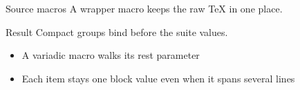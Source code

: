 


\begin{frame}{Source macros}
{%
\small\color{red}
A wrapper macro keeps the raw TeX in one place.
}

{%
\small\color{red}
}

\begin{block}{%
Result
}
Compact groups bind before the suite values.
\end{block}

\begin{itemize}
\item
A variadic macro walks its rest parameter
\item
Each item stays one block value
even when it spans several lines
\end{itemize}
\end{frame}
